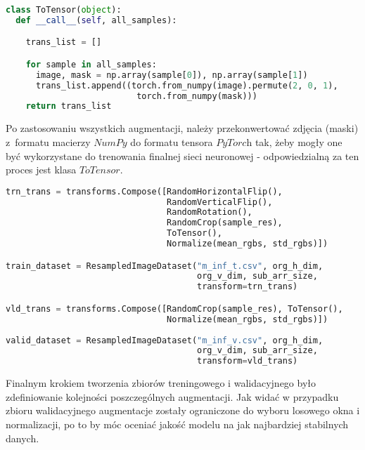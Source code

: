 \cell
\begin{lstlisting}[name=Rozdzial3.1, language=Python]
class ToTensor(object):
  def __call__(self, all_samples):

    trans_list = []

    for sample in all_samples:
      image, mask = np.array(sample[0]), np.array(sample[1])
      trans_list.append((torch.from_numpy(image).permute(2, 0, 1), 
                          torch.from_numpy(mask)))
    return trans_list
\end{lstlisting}


\cell
Po zastosowaniu wszystkich augmentacji, należy przekonwertować zdjęcia (maski) z~formatu macierzy $\textit{NumPy}$ do formatu tensora $\textit{PyTorch}$ tak, żeby mogły one być wykorzystane do trenowania finalnej sieci neuronowej - odpowiedzialną za ten proces jest klasa $\textit{ToTensor}$.

\cell
\begin{lstlisting}[name=Rozdzial3.1, language=Python]
trn_trans = transforms.Compose([RandomHorizontalFlip(), 
                                RandomVerticalFlip(),
                                RandomRotation(), 
                                RandomCrop(sample_res), 
                                ToTensor(), 
                                Normalize(mean_rgbs, std_rgbs)])

train_dataset = ResampledImageDataset("m_inf_t.csv", org_h_dim, 
                                      org_v_dim, sub_arr_size, 
                                      transform=trn_trans)

vld_trans = transforms.Compose([RandomCrop(sample_res), ToTensor(), 
                                Normalize(mean_rgbs, std_rgbs)])
                                
valid_dataset = ResampledImageDataset("m_inf_v.csv", org_h_dim, 
                                      org_v_dim, sub_arr_size, 
                                      transform=vld_trans)
\end{lstlisting}


\cell
Finalnym krokiem tworzenia zbiorów treningowego i walidacyjnego było zdefiniowanie kolejności poszczególnych augmentacji. Jak widać w przypadku zbioru walidacyjnego augmentacje zostały ograniczone do wyboru losowego okna i normalizacji, po to by móc oceniać jakość modelu na jak najbardziej stabilnych danych.
\vspace{0.5cm}

